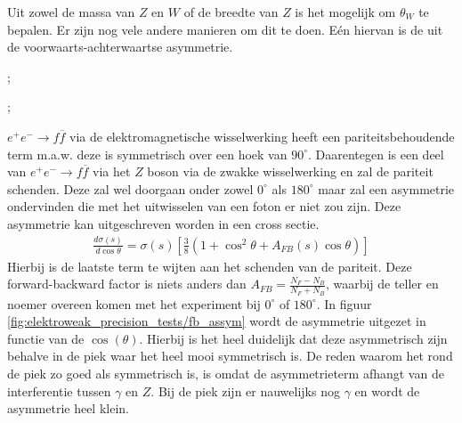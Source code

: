 \documentclass[../main.tex]{subfiles}
\begin{document}
Uit zowel de massa van $Z$ en $W$ of de breedte van $Z$ is het mogelijk om $\theta_W$ te bepalen. Er zijn nog vele andere manieren om dit te doen. Eén hiervan is de uit de voorwaarts-achterwaartse asymmetrie.\\
\begin{minipage}[c]{0.5\textwidth}
    \begin{center}
        ;
    \end{center}
\end{minipage}\noindent
\begin{minipage}[c]{0.5\textwidth}
    \begin{center}
        ;
    \end{center}
\end{minipage}
$e^+e^-\rightarrow f\overline f$ via de elektromagnetische wisselwerking heeft een pariteitsbehoudende term m.a.w. deze is symmetrisch over een hoek van $90^\circ$. Daarentegen is een deel van $e^+e^-\rightarrow f\overline f$ via het $Z$ boson via de zwakke wisselwerking en zal de pariteit schenden. Deze zal wel doorgaan onder zowel $0^\circ$ als $180^\circ$ maar zal een asymmetrie ondervinden die met het uitwisselen van een foton er niet zou zijn. Deze asymmetrie kan uitgeschreven worden in een cross sectie.
\begin{equation}
    \begin{aligned}
        \label{eq:fb_assym}
        \frac{d\sigma(s)}{d\cos\theta} = \sigma(s) \left[ \frac{3}{8} (1+\cos^2\theta + A_{FB}(s) \cos\theta) \right]
    \end{aligned}
\end{equation}
Hierbij is de laatste term te wijten aan het schenden van de pariteit. Deze forward-backward factor is niets anders dan $A_{FB} = \frac{N_F-N_B}{N_F+N_B}$, waarbij de teller en noemer overeen komen met het experiment bij $0^\circ$ of $180^\circ$. In figuur \ref{fig:elektroweak_precision_tests/fb_assym} wordt de asymmetrie uitgezet in functie van de $\cos(\theta)$. Hierbij is het heel duidelijk dat deze asymmetrisch zijn behalve in de piek waar het heel mooi symmetrisch is. De reden waarom het rond de piek zo goed als symmetrisch is, is omdat de asymmetrieterm afhangt van de interferentie tussen $\gamma$ en $Z$. Bij de piek zijn er nauwelijks nog $\gamma$ en wordt de asymmetrie heel klein.
\end{document}
